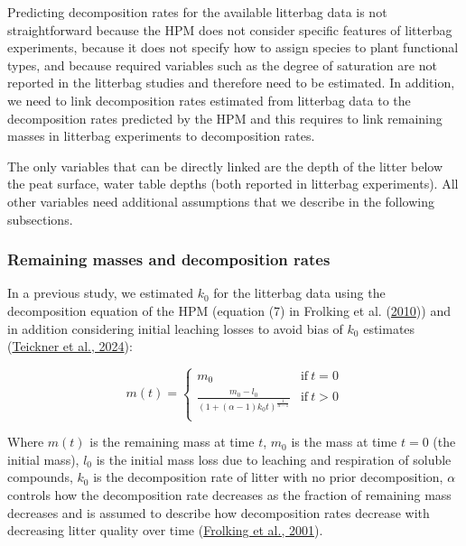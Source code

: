 \documentclass[
  12pt,
]{article}
\begin{document}
Predicting decomposition rates for the available litterbag data is not straightforward because the HPM does not consider specific features of litterbag experiments, because it does not specify how to assign species to plant functional types, and because required variables such as the degree of saturation are not reported in the litterbag studies and therefore need to be estimated. In addition, we need to link decomposition rates estimated from litterbag data to the decomposition rates predicted by the HPM and this requires to link remaining masses in litterbag experiments to decomposition rates.

The only variables that can be directly linked are the depth of the litter below the peat surface, water table depths (both reported in litterbag experiments). All other variables need additional assumptions that we describe in the following subsections.

\hypertarget{sdm-003-methods-3}{%
\subsubsection{Remaining masses and decomposition rates}\label{sdm-003-methods-3}}

In a previous study, we estimated \(k_0\) for the litterbag data using the decomposition equation of the HPM (equation (7) in Frolking et al. (\protect\hyperlink{ref-Frolking.2010}{2010})) and in addition considering initial leaching losses to avoid bias of \(k_0\) estimates (\protect\hyperlink{ref-Teickner.2024}{Teickner et al., 2024}):

\begin{equation}
m(t) = \begin{cases}
m_0 & \mathrm{if}~t=0\\
\frac{m_0 - l_0}{(1 + (\alpha - 1) k_0 t)^{\frac{1}{\alpha - 1}}} & \mathrm{if}~t>0\\
\end{cases}
\label{eq:decomposition-solution-2-with-leaching-1}
\end{equation}

Where \(m(t)\) is the remaining mass at time \(t\), \(m_0\) is the mass at time \(t=0\) (the initial mass), \(l_0\) is the initial mass loss due to leaching and respiration of soluble compounds, \(k_0\) is the decomposition rate of litter with no prior decomposition, \(\alpha\) controls how the decomposition rate decreases as the fraction of remaining mass decreases and is assumed to describe how decomposition rates decrease with decreasing litter quality over time (\protect\hyperlink{ref-Frolking.2001}{Frolking et al., 2001}).
\end{document}
